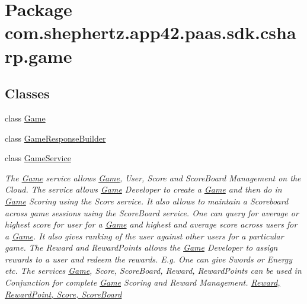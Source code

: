 \hypertarget{namespacecom_1_1shephertz_1_1app42_1_1paas_1_1sdk_1_1csharp_1_1game}{\section{Package com.\+shephertz.\+app42.\+paas.\+sdk.\+csharp.\+game}
\label{namespacecom_1_1shephertz_1_1app42_1_1paas_1_1sdk_1_1csharp_1_1game}
}
\subsection*{Classes}
\begin{DoxyCompactItemize}
\item 
class \hyperlink{classcom_1_1shephertz_1_1app42_1_1paas_1_1sdk_1_1csharp_1_1game_1_1_game}{Game}
\item 
class \hyperlink{classcom_1_1shephertz_1_1app42_1_1paas_1_1sdk_1_1csharp_1_1game_1_1_game_response_builder}{Game\+Response\+Builder}
\item 
class \hyperlink{classcom_1_1shephertz_1_1app42_1_1paas_1_1sdk_1_1csharp_1_1game_1_1_game_service}{Game\+Service}
\begin{DoxyCompactList}\small\item\em The \hyperlink{classcom_1_1shephertz_1_1app42_1_1paas_1_1sdk_1_1csharp_1_1game_1_1_game}{Game} service allows \hyperlink{classcom_1_1shephertz_1_1app42_1_1paas_1_1sdk_1_1csharp_1_1game_1_1_game}{Game}, User, Score and Score\+Board Management on the Cloud. The service allows \hyperlink{classcom_1_1shephertz_1_1app42_1_1paas_1_1sdk_1_1csharp_1_1game_1_1_game}{Game} Developer to create a \hyperlink{classcom_1_1shephertz_1_1app42_1_1paas_1_1sdk_1_1csharp_1_1game_1_1_game}{Game} and then do in \hyperlink{classcom_1_1shephertz_1_1app42_1_1paas_1_1sdk_1_1csharp_1_1game_1_1_game}{Game} Scoring using the Score service. It also allows to maintain a Scoreboard across game sessions using the Score\+Board service. One can query for average or highest score for user for a \hyperlink{classcom_1_1shephertz_1_1app42_1_1paas_1_1sdk_1_1csharp_1_1game_1_1_game}{Game} and highest and average score across users for a \hyperlink{classcom_1_1shephertz_1_1app42_1_1paas_1_1sdk_1_1csharp_1_1game_1_1_game}{Game}. It also gives ranking of the user against other users for a particular game. The Reward and Reward\+Points allows the \hyperlink{classcom_1_1shephertz_1_1app42_1_1paas_1_1sdk_1_1csharp_1_1game_1_1_game}{Game} Developer to assign rewards to a user and redeem the rewards. E.\+g. One can give Swords or Energy etc. The services \hyperlink{classcom_1_1shephertz_1_1app42_1_1paas_1_1sdk_1_1csharp_1_1game_1_1_game}{Game}, Score, Score\+Board, Reward, Reward\+Points can be used in Conjunction for complete \hyperlink{classcom_1_1shephertz_1_1app42_1_1paas_1_1sdk_1_1csharp_1_1game_1_1_game}{Game} Scoring and Reward Management. \hyperlink{classcom_1_1shephertz_1_1app42_1_1paas_1_1sdk_1_1csharp_1_1game_1_1_game_service}{Reward, Reward\+Point, Score, Score\+Board} \end{DoxyCompactList}\item 

\end{DoxyCompactItemize}
